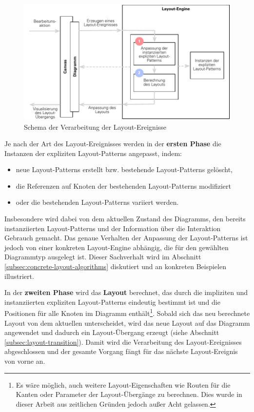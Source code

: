 \begin{figure}[hbt]
    \centering
    \includegraphics[width=\textwidth]{resources/processing-of-layout-events}
    \caption{Schema der Verarbeitung der Layout-Ereignisse}
    \label{fig:processing-of-layout-events}
\end{figure}

Je nach der Art des Layout-Ereignisses werden in der \textbf{ersten Phase} die Instanzen der expliziten Layout-Patterns angepasst, indem:

\begin{itemize}
    \item neue Layout-Patterns erstellt bzw. bestehende  Layout-Patterns gelöscht,
    \item die Referenzen auf Knoten der bestehenden Layout-Patterns modifiziert
    \item oder die bestehenden Layout-Patterns variiert werden.
\end{itemize}

Insbesondere wird dabei von dem aktuellen Zustand des Diagramms, den bereits instanziierten Layout-Patterns und der Information über die Interaktion Gebrauch gemacht. Das genaue Verhalten der Anpassung der Layout-Patterns ist jedoch von einer konkreten Layout-Engine abhängig, die für den gewählten Diagrammtyp ausgelegt ist. Dieser Sachverhalt wird im Abschnitt \ref{subsec:concrete-layout-algorithms} diskutiert und an konkreten Beispielen illustriert.

In der \textbf{zweiten Phase} wird das \textbf{Layout} berechnet, das durch die impliziten und instanziierten expliziten Layout-Patterns eindeutig bestimmt ist und die Positionen für alle Knoten im Diagramm enthält\footnote{Es wäre möglich, auch weitere Layout-Eigenschaften wie Routen für die Kanten oder Parameter der Layout-Übergänge zu berechnen. Dies wurde in dieser Arbeit aus zeitlichen Gründen jedoch außer Acht gelassen.}. Sobald sich das neu berechnete Layout von dem aktuellen unterscheidet, wird das neue Layout auf das Diagramm angewendet und dadurch ein Layout-Übergang erzeugt (siehe Abschnitt \ref{subsec:layout-transition}). Damit wird die Verarbeitung des Layout-Ereignisses abgeschlossen und der gesamte Vorgang fängt für das nächste Layout-Ereignis von vorne an.

